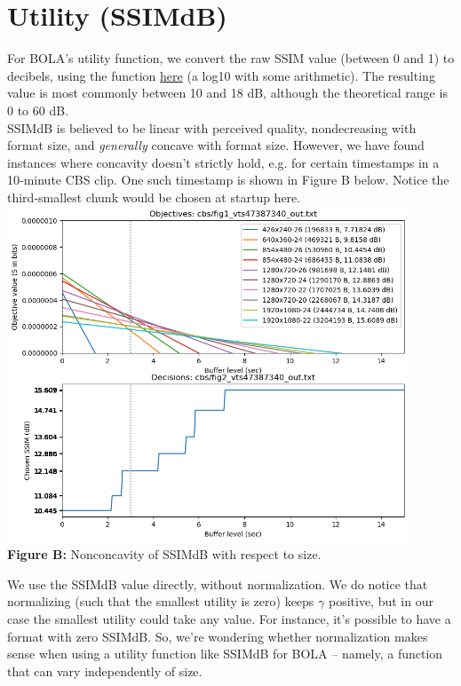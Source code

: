 \documentclass[12pt]{article}
\begin{document}
\section*{Utility (SSIMdB)}
\label{sec:Utility}
For BOLA's utility function, we convert the raw SSIM value (between 0 and 1) to decibels, using the function \href{https://github.com/StanfordSNR/puffer/blob/master/src/abr/abr_algo.cc}{here} (a log10 with some arithmetic). The resulting value is most commonly between 10 and 18 dB, although the theoretical range is 0 to 60 dB. \\
 
SSIMdB is believed to be linear with perceived quality, nondecreasing with format size, and \textit{generally} concave with format size. However, we have found instances where concavity doesn't strictly hold, e.g. for certain timestamps in a 10-minute CBS clip. One such timestamp is shown in Figure B below. Notice the third-smallest chunk would be chosen at startup here.\\

\includegraphics[width=0.9\textwidth]{single_vts47387340.png} \\
\textbf{Figure B:} Nonconcavity of SSIMdB with respect to size.
 
We use the SSIMdB value directly, without normalization. We do notice that normalizing (such that the smallest utility is zero) keeps $\gamma$ positive, but in our case the smallest utility could take any value. For instance, it's possible to have a format with zero SSIMdB. So, we're wondering whether normalization makes sense when using a utility function like SSIMdB for BOLA -- namely, a function that can vary independently of size.
\end{document}
